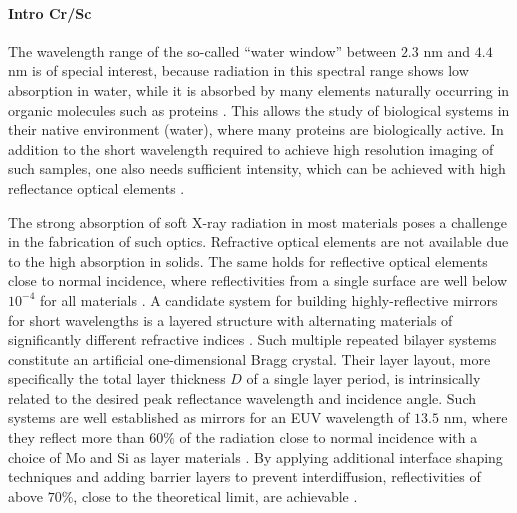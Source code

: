 \paragraph{Intro Cr/Sc}
The wavelength range of the so-called ``water window'' between $2.3$ nm and 
$4.4$ nm is of special interest, because radiation in this spectral range shows 
low absorption in water, while it is absorbed by many elements naturally 
occurring in organic molecules such as proteins \cite{kirz_soft_1995}. 
This allows the study of biological systems in their native environment 
(water), where many proteins are biologically active. In addition to the short 
wavelength required to achieve high resolution imaging of such samples, one 
also needs sufficient intensity, which can be achieved with high reflectance 
optical elements \cite{hertz_normal-incidence_1999,legall_compact_2012}.

The strong absorption of soft X-ray radiation in most materials poses a 
challenge in the fabrication of such optics. Refractive optical elements are 
not available due to the high absorption in solids. The same holds for 
reflective optical elements close to normal incidence, where reflectivities 
from a single surface are well below $10^{-4}$ for all materials \cite{henke_x-ray_1993}. 
A candidate system for building highly-reflective mirrors for short wavelengths 
is a layered structure with alternating materials of significantly different 
refractive indices \cite{spiller_low-loss_1972}. Such multiple repeated bilayer 
systems constitute an artificial one-dimensional Bragg crystal. Their layer 
layout, more specifically the total layer thickness $D$ of a single layer 
period, is intrinsically related to the desired peak reflectance wavelength and 
incidence angle. Such systems are well established as mirrors for an EUV 
wavelength of $13.5$ nm, where they reflect more than $60\%$ of the radiation 
close to normal incidence with a choice of Mo and Si as layer materials 
\cite{barbee_molybdenum-silicon_1985,stearns_fabrication_1991}. By applying additional interface 
shaping techniques and adding barrier layers to prevent interdiffusion, 
reflectivities of above $70\%$, close to the theoretical limit, are achievable 
\cite{bajt_improved_2002,braun_grenzflachen-optimierte_2003}.

